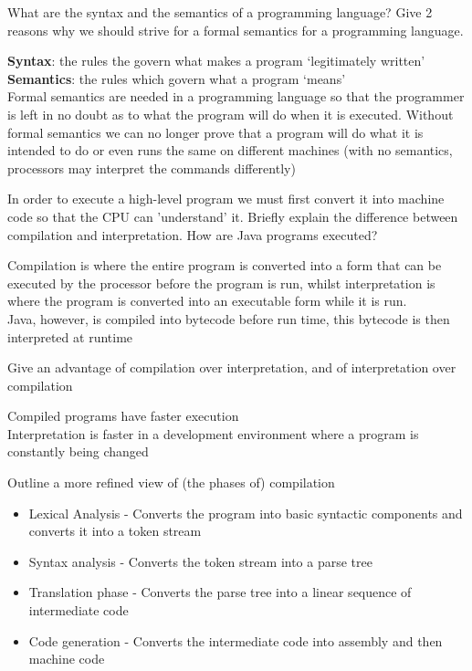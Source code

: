 \documentclass{exam}
\begin{document}
\begin{questions}
\question[6]What are the syntax and the semantics of a programming language?
Give 2 reasons why we should strive for a formal semantics for a programming
language.
\begin{solution}[2in]
	\textbf{Syntax}: the rules the govern what makes a program ‘legitimately written’\\
	\textbf{Semantics}: the rules which govern what a program ‘means’\\
	Formal semantics are needed in a programming language so that the programmer is left in no doubt as to what the program will do when it is executed. Without formal semantics we can no longer prove that a program will do what it is intended to do or even runs the same on different machines (with no semantics, processors may interpret the commands differently)
\end{solution}


\question[6]In order to execute a high-level program we must first convert it into machine code so that the CPU can 'understand' it. Briefly explain the difference between compilation and interpretation. How are Java programs executed?
\begin{solution}[2in]
	Compilation is where the entire program is converted into a form that can be executed by the processor before the program is run, whilst interpretation is where the program is converted into an executable form while it is run.\\
	Java, however, is compiled into bytecode before run time, this bytecode is then interpreted at runtime
\end{solution}

\question[2]Give an advantage of compilation over interpretation, and of interpretation over compilation
\begin{solution}[2in]
	Compiled programs have faster execution\\
	Interpretation is faster in a development environment where a program is constantly being changed
\end{solution}


\question[8]Outline a more refined view of (the phases of) compilation
\begin{solution}[2in]
	\begin{itemize}
		\item Lexical Analysis - Converts the program into basic syntactic components and converts it into a token stream
		\item Syntax analysis - Converts the token stream into a parse tree
		\item Translation phase - Converts the parse tree into a linear sequence of intermediate code
		\item Code generation - Converts the intermediate code into assembly and then machine code
	\end{itemize}
\end{solution}


\end{questions}
\end{document}
